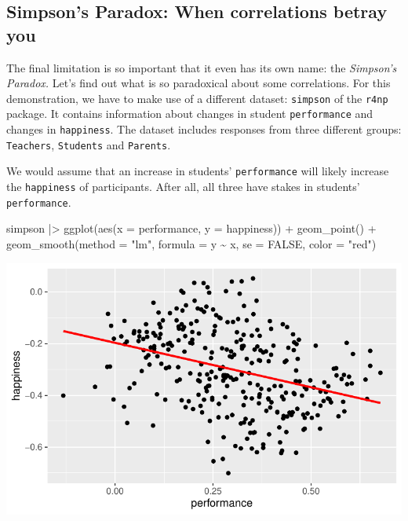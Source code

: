 \documentclass[
  letterpaper,
  DIV=11,
  numbers=noendperiod]{scrreprt}
\newenvironment{Shaded}{\begin{snugshade}}{\end{snugshade}}
\newcommand{\AttributeTok}[1]{\textcolor[rgb]{0.40,0.45,0.13}{#1}}
\newcommand{\ConstantTok}[1]{\textcolor[rgb]{0.56,0.35,0.01}{#1}}
\newcommand{\FunctionTok}[1]{\textcolor[rgb]{0.28,0.35,0.67}{#1}}
\newcommand{\NormalTok}[1]{\textcolor[rgb]{0.00,0.23,0.31}{#1}}
\newcommand{\SpecialCharTok}[1]{\textcolor[rgb]{0.37,0.37,0.37}{#1}}
\newcommand{\StringTok}[1]{\textcolor[rgb]{0.13,0.47,0.30}{#1}}
\begin{document}
\subsection{Simpson's Paradox: When correlations betray
you}\label{sec-simpsons-paradox}

The final limitation is so important that it even has its own name: the
\emph{Simpson's Paradox.} Let's find out what is so paradoxical about
some correlations. For this demonstration, we have to make use of a
different dataset: \texttt{simpson} of the \texttt{r4np} package. It
contains information about changes in student \texttt{performance} and
changes in \texttt{happiness}. The dataset includes responses from three
different groups: \texttt{Teachers}, \texttt{Students} and
\texttt{Parents}.

We would assume that an increase in students' \texttt{performance} will
likely increase the \texttt{happiness} of participants. After all, all
three have stakes in students' \texttt{performance}.

\begin{Shaded}
\begin{Highlighting}[]
\NormalTok{simpson }\SpecialCharTok{|\textgreater{}}
  \FunctionTok{ggplot}\NormalTok{(}\FunctionTok{aes}\NormalTok{(}\AttributeTok{x =}\NormalTok{ performance,}
             \AttributeTok{y =}\NormalTok{ happiness)) }\SpecialCharTok{+}
  \FunctionTok{geom\_point}\NormalTok{() }\SpecialCharTok{+}
  \FunctionTok{geom\_smooth}\NormalTok{(}\AttributeTok{method =} \StringTok{"lm"}\NormalTok{,}
              \AttributeTok{formula =}\NormalTok{ y }\SpecialCharTok{\textasciitilde{}}\NormalTok{ x,}
              \AttributeTok{se =} \ConstantTok{FALSE}\NormalTok{,}
              \AttributeTok{color =} \StringTok{"red"}\NormalTok{)}
\end{Highlighting}
\end{Shaded}

\includegraphics{10_correlations_files/figure-latex/simpson-paradox-plot-1.pdf}
\end{document}
